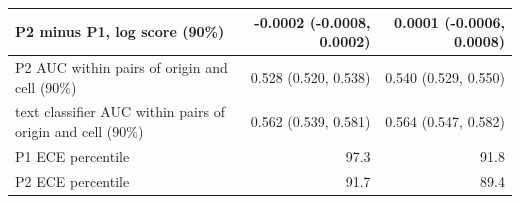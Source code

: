 \begin{tabular}{lrr}
P2 minus P1, log score (90\%) & -0.0002 (-0.0008, 0.0002) & 0.0001 (-0.0006, 0.0008) \\
\midrule
P2 AUC within pairs of origin and cell (90\%) & 0.528 (0.520, 0.538) & 0.540 (0.529, 0.550) \\
text classifier AUC within pairs of origin and cell (90\%) & 0.562 (0.539, 0.581) & 0.564 (0.547, 0.582) \\
\midrule
P1 ECE percentile & 97.3 & 91.8 \\
P2 ECE percentile & 91.7 & 89.4 \\
\bottomrule
\end{tabular}
